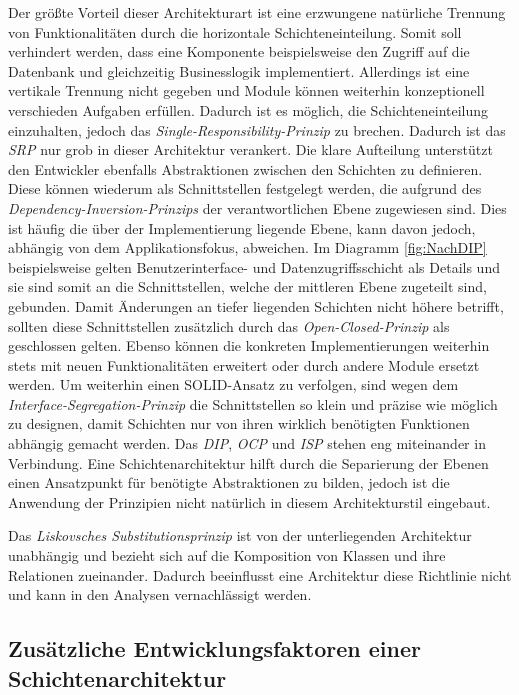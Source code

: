 \documentclass[conference]{IEEEtran}
\begin{document}
Der größte Vorteil dieser Architekturart ist eine erzwungene natürliche Trennung von Funktionalitäten durch die horizontale Schichteneinteilung. Somit soll verhindert werden, dass eine Komponente beispielsweise den Zugriff auf die Datenbank und gleichzeitig Businesslogik implementiert. Allerdings ist eine vertikale Trennung nicht gegeben und Module können weiterhin konzeptionell verschieden Aufgaben erfüllen. Dadurch ist es möglich, die Schichteneinteilung einzuhalten, jedoch das \emph{Single-Responsibility-Prinzip} zu brechen. Dadurch ist das \emph{SRP} nur grob in dieser Architektur verankert. Die klare Aufteilung unterstützt den Entwickler ebenfalls Abstraktionen zwischen den Schichten zu definieren. Diese können wiederum als Schnittstellen festgelegt werden, die aufgrund des \emph{Dependency-Inversion-Prinzips} der verantwortlichen Ebene zugewiesen sind. Dies ist häufig die über der Implementierung liegende Ebene, kann davon jedoch, abhängig von dem Applikationsfokus, abweichen. Im Diagramm \ref{fig:NachDIP} beispielsweise gelten Benutzerinterface- und Datenzugriffsschicht als Details und sie sind somit an die Schnittstellen, welche der mittleren Ebene zugeteilt sind, gebunden. Damit Änderungen an tiefer liegenden Schichten nicht höhere betrifft, sollten diese Schnittstellen zusätzlich durch das \emph{Open-Closed-Prinzip} als geschlossen gelten. Ebenso können die konkreten Implementierungen weiterhin stets mit neuen Funktionalitäten erweitert oder durch andere Module ersetzt werden. Um weiterhin einen SOLID-Ansatz zu verfolgen, sind wegen dem \emph{Interface-Segregation-Prinzip} die Schnittstellen so klein und präzise wie möglich zu designen, damit Schichten nur von ihren wirklich benötigten Funktionen abhängig gemacht werden. Das \emph{DIP}, \emph{OCP} und \emph{ISP} stehen eng miteinander in Verbindung. Eine Schichtenarchitektur hilft durch die Separierung der Ebenen einen Ansatzpunkt für benötigte Abstraktionen zu bilden, jedoch ist die Anwendung der Prinzipien nicht natürlich in diesem Architekturstil eingebaut.  

Das \emph{Liskovsches Substitutionsprinzip} ist von der unterliegenden Architektur unabhängig und bezieht sich auf die Komposition von Klassen und ihre Relationen zueinander. Dadurch beeinflusst eine Architektur diese Richtlinie nicht und kann in den Analysen vernachlässigt werden.



\subsection{Zusätzliche Entwicklungsfaktoren einer Schichtenarchitektur}
\end{document}
